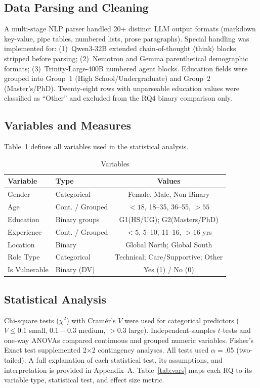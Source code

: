 \documentclass[conference]{IEEEtran}
\begin{document}
\subsection{Data Parsing and Cleaning}
A multi-stage NLP parser handled 20+ distinct LLM output formats (markdown key-value, pipe tables, numbered lists, prose paragraphs). 
Special handling was implemented for: (1)~Qwen3-32B extended chain-of-thought
$\langle$think$\rangle$ blocks stripped before parsing; (2)~Nemotron and
Gemma parenthetical demographic formats; (3)~Trinity-Large-400B numbered agent
blocks. Education fields were grouped into Group~1 (High School/Undergraduate)
and Group~2 (Master's/PhD). 
Twenty-eight rows with unparseable education values were classified as ``Other'' and excluded from the RQ4 binary comparison only.

\subsection{Variables and Measures}
Table~\ref{tab:variables} defines all variables used in the statistical analysis.

\begin{table}[htbp]
\caption{Variables}
\label{tab:variables}
\begin{center}
\renewcommand{\arraystretch}{1.5}
\begin{tabular}{|l|l|c|}
\hline
\textbf{Variable} & \textbf{Type} & \textbf{Values} \\
\hline
Gender          & Categorical           & Female, Male, Non-Binary  \\
Age             & Cont. / Grouped       & $<18$, 18–35, 36–55, $>55$  \\
Education       & Binary groups         & G1(HS/UG); G2(Masters/PhD)  \\
Experience      & Cont. / Grouped       & $<5$, 5–10, 11–16, $>16$ yrs  \\
Location        & Binary                & Global North; Global South  \\
Role Type       & Categorical           & Technical; Care/Supportive; Other  \\
Is Vulnerable   & Binary (DV)           & Yes (1) / No (0)  \\
\hline
\end{tabular}
\end{center}
\end{table}

\subsection{Statistical Analysis}
Chi-square tests ($\chi^2$) with Cram\'{e}r's $V$ were used for categorical predictors ($V{\leq}0.1$ small, $0.1{-}0.3$ medium, ${>}0.3$ large).
Independent-samples $t$-tests and one-way ANOVAs compared continuous and grouped numeric variables. 
Fisher's Exact test supplemented 2$\times$2 contingency analyses. 
All tests used $\alpha{=}.05$ (two-tailed). A full explanation of each statistical test, its assumptions, and interpretation is provided in Appendix~A. Table~\ref{tab:vars} maps each RQ to its variable type, statistical test, and effect size metric.
\end{document}
